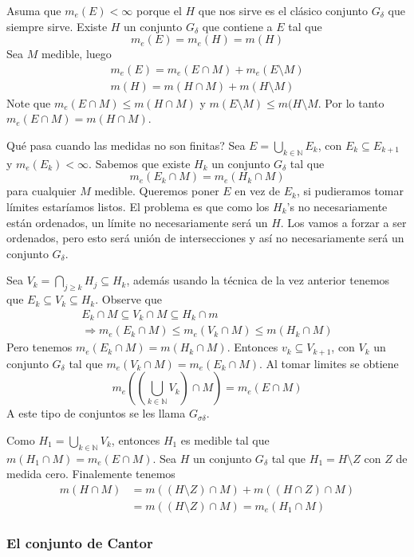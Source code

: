 \documentclass[12pt]{article}
\theoremstyle{plain}
\theoremstyle{definition}
\theoremstyle{remark}
\numberwithin{equation}{section}
\newcommand{\sg}{\sigma}            %
\newcommand{\bN}{\mathbb{N}}        %
\renewcommand{\geq}{\geqslant}      %
\renewcommand{\leq}{\leqslant}      %
\renewcommand{\:}{\colon}           %
\begin{document}
\begin{multicols}{2}
\begin{ptcbp}
Asuma que $m_e(E)<\infty$ porque el $H$ que nos sirve es el clásico conjunto $G_\delta$ que siempre sirve. Existe $H$ un conjunto $G_\delta$ que contiene a $E$ tal que
$$m_e(E)=m_e(H)=m(H)$$
Sea $M$ medible, luego
\begin{gather*}
  m_e(E)=m_e(E\cap M)+m_e(E\setminus M)\\
  m(H)=m(H\cap M)+m(H\setminus M)
\end{gather*}
Note que $m_e(E\cap M)\leq m(H\cap M)$ y $m(E\setminus M)\leq m(H\setminus M$. Por lo tanto $m_e(E\cap M)=m(H\cap M)$.\par
Qué pasa cuando las medidas no son finitas? Sea $E= \bigcup_{k\in\bN}E_k$, con $E_k\subseteq E_{k+1}$ y $m_e(E_k)<\infty$. Sabemos que existe $H_k$ un conjunto $G_\delta$ tal que
$$m_e(E_k\cap M)=m_e(H_k\cap M)$$
para cualquier $M$ medible. Queremos poner $E$ en vez de $E_k$, si pudieramos tomar límites estaríamos listos. El problema es que como los $H_k$'s no necesariamente están ordenados, un límite no necesariamente será un $H$. Los vamos a forzar a ser ordenados, pero esto será unión de intersecciones y así no necesariamente será un conjunto $G_\delta$.\par
Sea $V_k=\bigcap_{j\geq k}H_j\subseteq H_k$, además usando la técnica de la vez anterior tenemos que $E_k\subseteq V_k\subseteq H_k$.%
 Observe que
\begin{gather*}
  E_k\cap M\subseteq V_k\cap M\subseteq H_k\cap m\\
  \Rightarrow m_e(E_k\cap M)\leq m_e(V_k\cap M)\leq m(H_k\cap M)
\end{gather*}
Pero tenemos $m_e(E_k\cap M)=m(H_k\cap M)$. Entonces $v_k\subseteq V_{k+1}$, con $V_k$ un conjunto $G_\delta$ tal que $m_e(V_k\cap M)=m_e(E_k\cap M)$. Al tomar limites se obtiene
$$m_e(\left(\bigcup_{k\in\bN}V_k\right)\cap M)=m_e(E\cap M)$$
A este tipo de conjuntos se les llama $G_{\sg\delta}$.\par
Como $H_1=\bigcup_{k\in\bN}V_k$, entonces $H_1$ es medible tal que $m(H_1\cap M)=m_e(E\cap M)$. Sea $H$ un conjunto $G_\delta$ tal que $H_1=H\setminus Z$ con $Z$ de medida cero. Finalemente tenemos
\begin{align*}
  m(H\cap M) &=m((H\setminus Z)\cap M)+m((H\cap Z)\cap M)\\
  &=m((H\setminus Z)\cap M)=m_e(H_1\cap M)
\end{align*}
\end{ptcbp}

\subsubsection*{El conjunto de Cantor}


\end{multicols}
\end{document}

